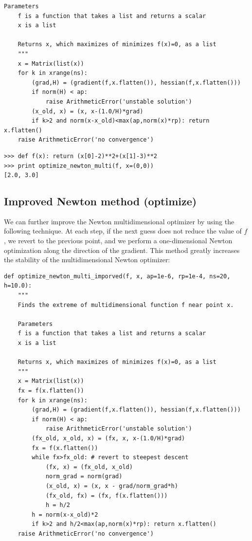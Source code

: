 \documentclass[justified,sixbynine]{tufte-book}
\def\ft{\small\tt}
\theoremstyle{plain}%
\theoremstyle{definition}
\theoremstyle{remark}
\begin{document}
\begin{fullwidth}
\begin{lstlisting}[caption={in file: {\ft nlib.py}}]
    Parameters
    f is a function that takes a list and returns a scalar
    x is a list

    Returns x, which maximizes of minimizes f(x)=0, as a list
    """
    x = Matrix(list(x))
    for k in xrange(ns):
        (grad,H) = (gradient(f,x.flatten()), hessian(f,x.flatten()))
        if norm(H) < ap:
            raise ArithmeticError('unstable solution')
        (x_old, x) = (x, x-(1.0/H)*grad)
        if k>2 and norm(x-x_old)<max(ap,norm(x)*rp): return x.flatten()
    raise ArithmeticError('no convergence')
\end{lstlisting}

\begin{lstlisting}[caption={in file: {\ft nlib.py}}]
>>> def f(x): return (x[0]-2)**2+(x[1]-3)**2
>>> print optimize_newton_multi(f, x=(0,0))
[2.0, 3.0]
\end{lstlisting}

\goodbreak\subsection{Improved Newton method (optimize)}

We can further improve the Newton multidimensional optimizer by using the following technique. At each step, if the next guess does not reduce the value of $f$, we revert to the previous point, and we perform a one-dimensional Newton optimization along the direction of the gradient. This method greatly increases the stability of the multidimensional Newton optimizer:

\begin{lstlisting}[caption={in file: {\ft nlib.py}}]
def optimize_newton_multi_imporved(f, x, ap=1e-6, rp=1e-4, ns=20, h=10.0):
    """
    Finds the extreme of multidimensional function f near point x.

    Parameters
    f is a function that takes a list and returns a scalar
    x is a list

    Returns x, which maximizes of minimizes f(x)=0, as a list
    """
    x = Matrix(list(x))
    fx = f(x.flatten())
    for k in xrange(ns):
        (grad,H) = (gradient(f,x.flatten()), hessian(f,x.flatten()))
        if norm(H) < ap:
            raise ArithmeticError('unstable solution')
        (fx_old, x_old, x) = (fx, x, x-(1.0/H)*grad)
        fx = f(x.flatten())
        while fx>fx_old: # revert to steepest descent
            (fx, x) = (fx_old, x_old)
            norm_grad = norm(grad)
            (x_old, x) = (x, x - grad/norm_grad*h)
            (fx_old, fx) = (fx, f(x.flatten()))
            h = h/2
        h = norm(x-x_old)*2
        if k>2 and h/2<max(ap,norm(x)*rp): return x.flatten()
    raise ArithmeticError('no convergence')
\end{lstlisting}


\end{fullwidth}
\end{document}
